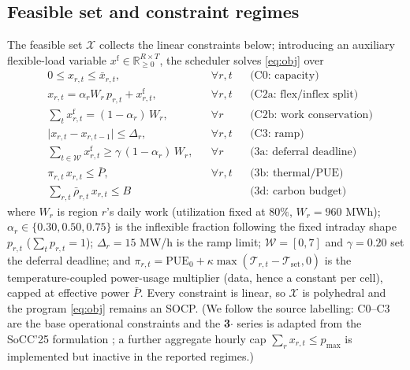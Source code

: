 \documentclass[12pt]{article}
\newcommand{\R}{\mathbb{R}}
\begin{document}
\subsection{Feasible set and constraint regimes}\label{sec:constraints}
The feasible set $\mathcal{X}$ collects the linear constraints below; introducing an
auxiliary flexible-load variable $x^{\mathrm f}\in\R^{R\times T}_{\ge0}$, the
scheduler solves \eqref{eq:obj} over
\begin{subequations}\label{eq:feasible}
\begin{align}
&0\le x_{r,t}\le\bar x_{r,t}, && \forall r,t
  &&\text{(C0: capacity)}\\[2pt]
&x_{r,t}=\alpha_r W_r\,p_{r,t}+x^{\mathrm f}_{r,t}, && \forall r,t
  &&\text{(C2a: flex/inflex split)}\\[2pt]
&\textstyle\sum_{t} x^{\mathrm f}_{r,t}=(1-\alpha_r)\,W_r, && \forall r
  &&\text{(C2b: work conservation)}\\[2pt]
&\lvert x_{r,t}-x_{r,t-1}\rvert\le\Delta_r, && \forall r,t
  &&\text{(C3: ramp)}\\[2pt]
&\textstyle\sum_{t\in\mathcal W} x^{\mathrm f}_{r,t}\ge\gamma\,(1-\alpha_r)\,W_r,
  && \forall r &&\text{(3a: deferral deadline)}\\[2pt]
&\pi_{r,t}\,x_{r,t}\le\bar P, && \forall r,t
  &&\text{(3b: thermal/PUE)}\\[2pt]
&\textstyle\sum_{r,t}\bar\rho_{r,t}\,x_{r,t}\le B
  && &&\text{(3d: carbon budget)}
\end{align}
\end{subequations}
where $W_r$ is region $r$'s daily work (utilization fixed at $80\%$, $W_r=960$ MWh);
$\alpha_r\in\{0.30,0.50,0.75\}$ is the inflexible fraction following the fixed
intraday shape $p_{r,t}$ ($\sum_t p_{r,t}=1$); $\Delta_r=15$ MW/h is the ramp limit;
$\mathcal W=[0,7]$ and $\gamma=0.20$ set the deferral deadline; and
$\pi_{r,t}=\mathrm{PUE}_0+\kappa\max(\mathcal T_{r,t}-\mathcal T_{\mathrm{set}},0)$
is the temperature-coupled power-usage multiplier (data, hence a constant per cell),
capped at effective power $\bar P$. Every constraint is linear, so $\mathcal X$ is
polyhedral and the program \eqref{eq:obj} remains an SOCP. (We follow the source
labelling: C0--C3 are the base operational constraints and the \textbf{3$\cdot$}
series is adapted from the SoCC'25 formulation \citep{wijayawardana2025}; a further
aggregate hourly cap $\sum_r x_{r,t}\le p_{\max}$ is implemented but inactive in the
reported regimes.)
\end{document}
